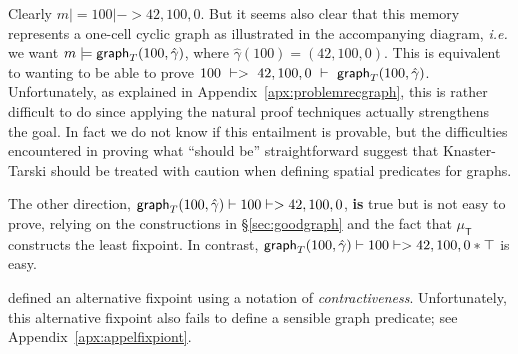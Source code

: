 \noindent Clearly $m |= 100 |-> 42,100,0$.  But it seems also clear that this memory represents a one-cell cyclic graph as illustrated in the accompanying diagram, \emph{i.e.} we want $m |= \mathsf{graph}_T(100,\hat{\gamma})$, where $\hat{\gamma}(100) = (42,100,0)$.  This is equivalent to wanting to be able to prove $100~|->~42,100,0~|-~\mathsf{graph}_T(100,\hat{\gamma})$.  Unfortunately, as explained in Appendix~\ref{apx:problemrecgraph}, this is rather difficult to do since applying the natural proof techniques actually strengthens the goal. In fact we do not know if this entailment is provable, but the difficulties encountered in proving what ``should be'' straightforward suggest that Knaster-Tarski should be treated with caution when defining spatial predicates for graphs.

The other direction, \mbox{$\mathsf{graph}_T(100,\hat{\gamma}) |- 100 |-> 42,100,0$},
\textbf{is} true but is not easy to prove, relying on the constructions in \S\ref{sec:goodgraph} and the fact that $\mu_{\mathsf{T}}$ constructs the least fixpoint.  In contrast, $\mathsf{graph}_T(100,\hat{\gamma}) |- 100 |-> 42,100,0 * \top$ is easy. %

\cite{appel:fixpoint} defined an alternative fixpoint using a notation of \emph{contractiveness}.  Unfortunately, this alternative fixpoint also
fails to define a sensible graph predicate; see Appendix~\ref{apx:appelfixpiont}.





